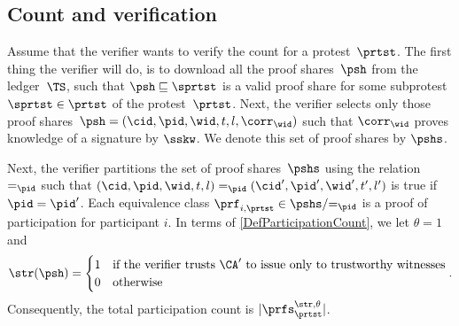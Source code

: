 \subsection{Count and verification}%
\label{ProtocolVerification}


Assume that the verifier wants to verify the count for a protest~\(\prtst\).
The first thing the verifier will do, is to download all the proof 
shares~\(\psh\) from the ledger~\(\TS\), such that \(\psh \sqsubseteq \sprtst\) 
is a valid proof share for some subprotest~\(\sprtst\in\prtst\) of the 
protest~\(\prtst\).
Next, the verifier selects only those proof shares~\(\psh = (\cid, \pid, \wid, 
t, l, \corr_{\wid})\) such that \(\corr_\wid\) proves knowledge of a signature 
by \(\sskw\).
We denote this set of proof shares by \(\pshs\).

Next, the verifier partitions the set of proof shares~\(\pshs\) using the 
relation~\(=_\pid\) such that \(
  (\cid, \pid, \wid, t, l) =_\pid (\cid', \pid', \wid', t', l')
\) is true if \(\pid = \pid'\).
Each equivalence class \(\prf_{i, \prtst} \in \pshs/{=_\pid}\) is a proof of 
participation for participant \(i\).
In terms of \cref{DefParticipationCount}, we let \(\theta = 1\) and \[
  \str(\psh) =
    \begin{cases}
      1 & \text{if the verifier trusts \(\CA'\) to issue only to trustworthy 
        witnesses} \\
      0 & \text{otherwise}
    \end{cases}.
\] Consequently, the total participation count is \(|\prfs_\prtst^{\str, 
\theta}|\).

\endinput

